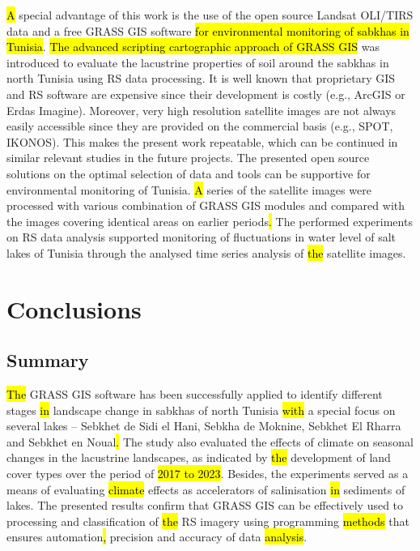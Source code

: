 \documentclass[land,article,submit,pdftex,moreauthors]{Definitions/mdpi}
\begin{document}
\hl{A }special advantage of this work is the use of the open source Landsat OLI/TIRS data and a free GRASS GIS software \hl{for  environmental monitoring of sabkhas in Tunisia}. \hl{The advanced scripting cartographic approach of GRASS GIS} was introduced to evaluate the lacustrine properties of soil around the sabkhas in north Tunisia using RS data processing. It is well known that proprietary GIS and RS software are expensive since their development is costly (e.g., ArcGIS or Erdas Imagine). Moreover, very high resolution satellite images are not always easily accessible since they are provided on the commercial basis (e.g., SPOT, IKONOS). This makes the present work repeatable, which can be continued in similar relevant studies in the future projects. The presented open source solutions on the optimal selection of data and tools can be supportive for environmental monitoring  of Tunisia. \hl{A }series of the satellite images were processed with various combination of GRASS GIS modules and compared with the images covering identical areas on earlier periods\hl{. }The performed experiments on RS data analysis supported monitoring of fluctuations in water level of salt lakes of Tunisia through the analysed time series analysis of \hl{the }satellite images. 

\section{Conclusions}

\subsection{Summary}

\hl{The }GRASS GIS software has been successfully applied to identify different stages \hl{in }landscape change in sabkhas of north Tunisia \hl{with} a special focus on several lakes -- Sebkhet de Sidi el Hani, Sebkha de Moknine, Sebkhet El Rharra and Sebkhet en Noual\hl{. }The study also evaluated the effects of climate on seasonal changes in the lacustrine landscapes, as indicated by \hl{the }development of land cover types over the period of \hl{2017 to 2023}. Besides, the experiments served as a means of evaluating \hl{climate} effects as accelerators of salinisation\hl{ in }sediments of lakes. The presented results confirm that GRASS GIS can be effectively used to processing and classification of \hl{the }RS imagery using programming \hl{methods} that ensures automation\hl{, }precision and accuracy of data \hl{analysis}. 
\end{document}
